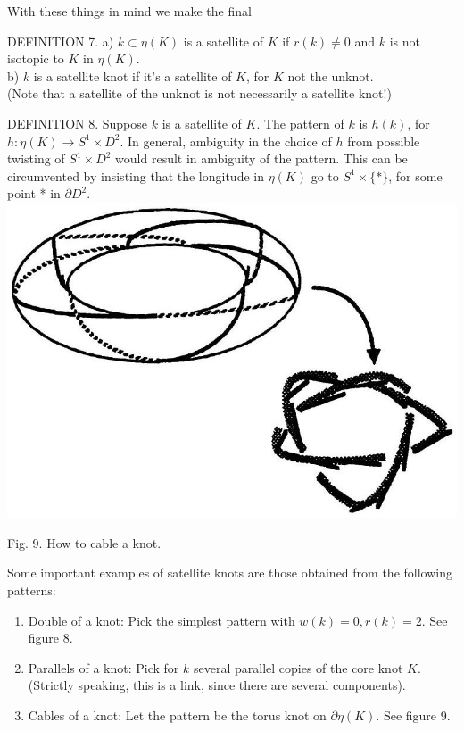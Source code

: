 \documentclass[10pt, letterpaper]{article}
\begin{document}
With these things in mind we make the final

DEFINITION 7. a) $k \subset \eta(K)$ is a satellite of $K$ if $r(k) \neq 0$ and $k$ is not isotopic to $K$ in $\eta(K)$.\\
b) $k$ is a satellite knot if it's a satellite of $K$, for $K$ not the unknot.\\
(Note that a satellite of the unknot is not necessarily a satellite knot!)

DEFINITION 8. Suppose $k$ is a satellite of $K$. The pattern of $k$ is $h(k)$, for $h: \eta(K) \rightarrow S^{1} \times D^{2}$. In general, ambiguity in the choice of $h$ from possible twisting of $S^{1} \times D^{2}$ would result in ambiguity of the pattern. This can be circumvented by insisting that the longitude in $\eta(K)$ go to $S^{1} \times\{*\}$, for some point * in $\partial D^{2}$.\\
\includegraphics[scale=0.2, center]{2025_05_21_037de704f595ce642d3eg-082}

Fig. 9. How to cable a knot.

Some important examples of satellite knots are those obtained from the following patterns:

\begin{enumerate}
  \item Double of a knot: Pick the simplest pattern with $w(k)=0, r(k)=2$. See figure 8.
  \item Parallels of a knot: Pick for $k$ several parallel copies of the core knot $K$. (Strictly speaking, this is a link, since there are several components).
  \item Cables of a knot: Let the pattern be the torus knot on $\partial \eta(K)$. See figure 9.
\end{enumerate}
\end{document}
